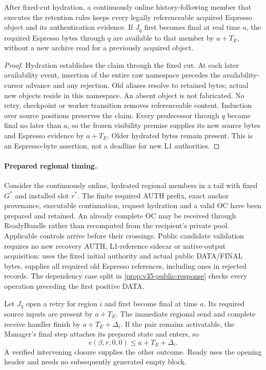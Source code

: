 \begin{proposition}
\label{prop:retained-public-bytes}
After fixed-cut hydration, a continuously online history-following
member that executes the retention rules keeps every legally
referenceable acquired Espresso object and its authentication evidence.
If $J_q$ first becomes final at real time $a$, the required Espresso
bytes through $q$ are available to that member by $a+T_E$, without a
new archive read for a previously acquired object.
\end{proposition}
\begin{proof}
Hydration establishes the claim through the fixed cut. At each later
availability event, insertion of the entire raw namespace precedes the
availability-cursor advance and any rejection. Old aliases resolve to
retained bytes; actual new objects reside in this namespace. An absent
object is not fabricated. No retry, checkpoint or worker transition
removes referenceable content. Induction over source positions preserves
the claim. Every predecessor through $q$ became final no later than $a$,
so the frozen visibility premise supplies its new source bytes and
Espresso evidence by $a+T_E$. Older hydrated bytes remain present.
This is an Espresso-byte assertion, not a deadline for new L1 authorities.
\end{proof}

\paragraph{Prepared regional timing.}
\label{sec:source-step-timing}
Consider the continuously online, hydrated regional members in a tail
with fixed $G^*$ and installed slot $r^*$. The finite required AUTH
prefix, exact anchor provenance, executable continuation, request
hydration and a valid OC have been prepared and retained. An already
complete OC may be received through ReadyBundle rather than recomputed
from the recipient's private pool. Applicable controls arrive before their
crossings. Public candidate validation requires no new recovery AUTH,
L1-reference sidecar or native-output acquisition: 
uses the fixed initial authority and actual public DATA/FINAL bytes.
 supplies all required old Espresso
references, including ones in rejected records. The dependency case
split in \cref{prop:v35-public-response} checks every operation preceding
the first positive DATA.

Let $J_q$ open a retry for region $i$ and first become final at time
$a$. Its required source inputs are present by $a+T_E$. The immediate
regional send and complete receive handler finish by
$a+T_E+\Delta_i$. If the pair remains activatable, the Manager's final
step attaches its prepared state and enters, so
\[
 e(\beta,r,0,0)\le a+T_E+\Delta_i.
\]
A verified intervening closure supplies the other outcome. Ready uses
the opening header and needs no subsequently generated empty block.

